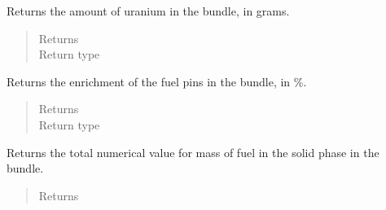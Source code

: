 \documentclass[letterpaper,10pt,openany,oneside,english]{sphinxmanual}
\begin{document}
\begin{fulllineitems}

\begin{fulllineitems}
\label{\detokenize{support_rst/fuel_bundle:fuel_bundle.FuelBundle.get_fresh_u_mass}}
Returns the amount of uranium in the bundle, in grams.
\begin{quote}\begin{description}
\item[{Returns}] \leavevmode
{}

\item[{Return type}] \leavevmode
{}

\end{description}\end{quote}

\end{fulllineitems}


\begin{fulllineitems}
\label{\detokenize{support_rst/fuel_bundle:fuel_bundle.FuelBundle.get_fuel_enrichment}}
Returns the enrichment of the fuel pins in the bundle, in \%.
\begin{quote}\begin{description}
\item[{Returns}] \leavevmode
{}

\item[{Return type}] \leavevmode
{}

\end{description}\end{quote}

\end{fulllineitems}


\begin{fulllineitems}
\label{\detokenize{support_rst/fuel_bundle:fuel_bundle.FuelBundle.get_fuel_mass}}
Returns the total numerical value for  mass of fuel in the solid phase
in the bundle.
\begin{quote}\begin{description}
\item[{Returns}] \leavevmode
{}


\end{description}
\end{quote}
\end{fulllineitems}
\end{fulllineitems}
\end{document}
